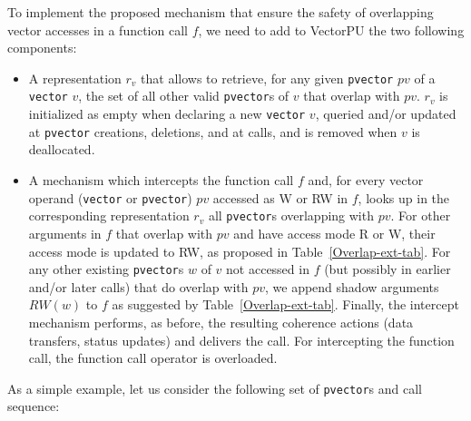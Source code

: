 \documentclass[preprint,12pt]{elsarticle}
\newcommand{\TODO}[1]{\textcolor{red}{\textbf{[TODO:#1]}}}
\begin{document}
To implement the proposed mechanism that ensure the safety of overlapping vector accesses
in a function call $f$, we need to add to VectorPU the two following components:
\begin{itemize}
    \item A representation $r_v$ that allows to retrieve, for any given \texttt{pvector} $pv$
             of a \texttt{vector} $v$, the set of all other valid \texttt{pvector}s of $v$ 
             that overlap with $pv$.
             $r_v$ is initialized as empty when declaring a new \texttt{vector} $v$,
             queried and/or updated at \texttt{pvector} creations, deletions, and at calls,
             and is removed when $v$ is deallocated.
    \item A mechanism which intercepts the function call $f$ and,
          for every vector operand (\texttt{vector} or \texttt{pvector}) $pv$ 
          accessed as W or RW in $f$,
          looks up in the corresponding representation $r_v$ all  
          \texttt{pvector}s overlapping with $pv$. %
          For other arguments in $f$ that overlap with $pv$ and have access mode
          R or W, their access mode
          is updated to RW, as proposed in Table~\ref{Overlap-ext-tab}.
          For any other existing \texttt{pvector}s $w$ of $v$ not accessed in $f$
          (but possibly in earlier and/or later calls) 
          that do overlap with $pv$, 
          we append shadow arguments $RW(w)$ to $f$ as suggested by Table~\ref{Overlap-ext-tab}.
          Finally, the intercept mechanism performs, as before, the resulting coherence
          actions (data transfers, status updates) and delivers the call.
          For intercepting the function call, the function call operator is overloaded.
\end{itemize}

As a simple example, let us consider the following set of \texttt{pvector}s and call sequence:
\end{document}
